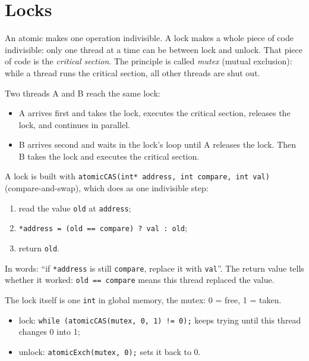\documentclass[main.tex]{subfiles}
\begin{document}
\section{Locks}
\label{sec:locks}

An atomic makes one operation indivisible. A lock makes a whole piece of code indivisible: only one thread at a time can be between lock and unlock. That piece of code is the \emph{critical section}.
The principle is called \emph{mutex} (mutual exclusion): while a thread runs the critical section, all other threads are shut out.

Two threads A and B reach the same lock:
\begin{itemize}[nosep]
  \item A arrives first and takes the lock, executes the critical section, releases the lock, and continues in parallel.
  \item B arrives second and waits in the lock's loop until A releases the lock. Then B takes the lock and executes the critical section.
\end{itemize}

A lock is built with \texttt{atomicCAS(int* address, int compare, int val)} (compare-and-swap), which does as one indivisible step:
\begin{enumerate}[nosep]
  \item read the value \texttt{old} at \texttt{address};
  \item \texttt{*address = (old == compare) ? val : old};
  \item return \texttt{old}.
\end{enumerate}
In words: ``if \texttt{*address} is still \texttt{compare}, replace it with \texttt{val}''. The return value tells whether it worked: \texttt{old == compare} means this thread replaced the value.

The lock itself is one \texttt{int} in global memory, the mutex: 0 = free, 1 = taken.
\begin{itemize}[nosep]
  \item lock: \texttt{while (atomicCAS(mutex, 0, 1) != 0);} keeps trying until this thread changes 0 into 1;
  \item unlock: \texttt{atomicExch(mutex, 0);} sets it back to 0.
\end{itemize}
\end{document}
